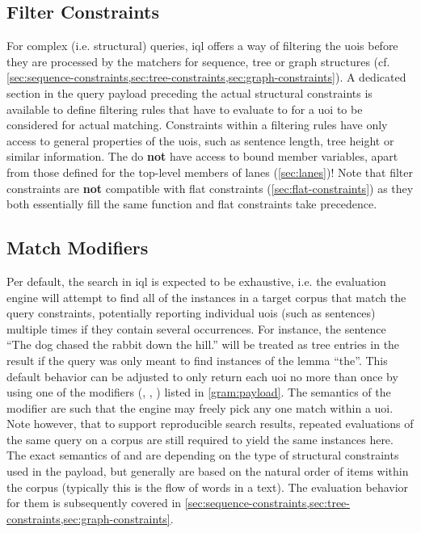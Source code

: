\documentclass[11pt,a4paper]{report}
\begin{document}
\subsection{Filter Constraints}
\label{sec:filter-constraints}
\noindent For complex (i.e. structural) queries, \ac{iql} offers a way of filtering the \acp{uoi} before they are processed by the matchers for sequence, tree or graph structures (cf. \cref{sec:sequence-constraints,sec:tree-constraints,sec:graph-constraints}).
A dedicated  section in the query payload preceding the actual structural constraints is available to define filtering rules that have to evaluate to  for a \ac{uoi} to be considered for actual matching.
Constraints within a filtering rules have only access to general properties of the \acp{uoi}, such as sentence length, tree height or similar information.
The do \textbf{not} have access to bound member variables, apart from those defined for the top-level members of lanes (\ref{sec:lanes})!
Note that filter constraints are \textbf{not} compatible with flat constraints (\ref{sec:flat-constraints}) as they both essentially fill the same function and flat constraints take precedence.

\subsection{Match Modifiers}
\label{sec:match-modifiers}
Per default, the search in \ac{iql} is expected to be exhaustive, i.e. the evaluation engine will attempt to find all of the instances in a target corpus that match the query constraints, potentially reporting individual \acp{uoi} (such as sentences) multiple times  if they contain several occurrences.
For instance, the sentence ``The dog chased the rabbit down the hill.'' will be treated as tree entries in the result if the query was only meant to find instances of the lemma ``the''.
This default behavior can be adjusted to only return each \ac{uoi} no more than once by using one of the modifiers (, , ) listed in \cref{gram:payload}.
The semantics of the  modifier are such that the engine may freely pick any one match within a \ac{uoi}.
Note however, that to support reproducible search results, repeated evaluations of the same query on a corpus are still required to yield the same instances here.
The exact semantics of  and  are depending on the type of structural constraints used in the payload, but generally are based on the natural order of items within the corpus (typically this is the flow of words in a text).
The evaluation behavior for them is subsequently covered in \cref{sec:sequence-constraints,sec:tree-constraints,sec:graph-constraints}.
\end{document}
